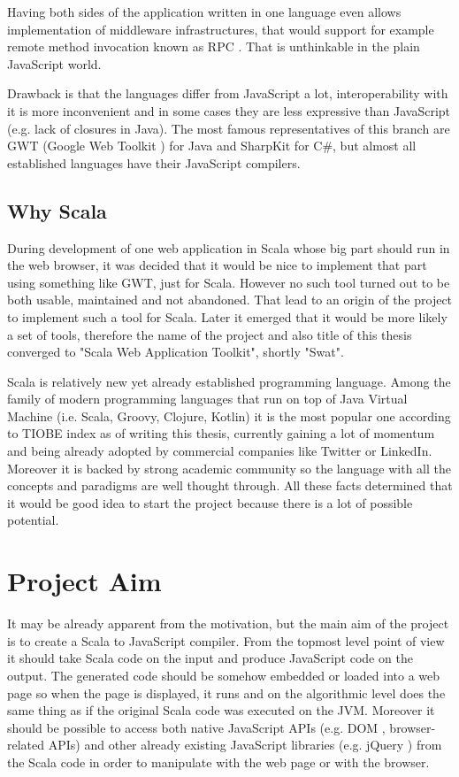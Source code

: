 \documentclass[12pt,a4paper]{report}
\begin{document}
Having both sides of the application written in one language even allows implementation of middleware infrastructures, that would support for example remote method invocation known as RPC \cite{Rpc}. That is unthinkable in the plain JavaScript world.

Drawback is that the languages differ from JavaScript a lot, interoperability with it is more inconvenient and in some cases they are less expressive than JavaScript (e.g. lack of closures in Java). The most famous representatives of this branch are GWT (Google Web Toolkit \cite{Gwt}) for Java and SharpKit \cite{SharpKit} for C\#, but almost all established languages have their JavaScript compilers.

\subsection{Why Scala}

During development of one web application in Scala whose big part should run in the web browser, it was decided that it would be nice to implement that part using something like GWT, just for Scala. However no such tool turned out to be both usable, maintained and not abandoned. That lead to an origin of the project to implement such a tool for Scala. Later it emerged that it would be more likely a set of tools, therefore the name of the project and also title of this thesis converged to "Scala Web Application Toolkit", shortly "Swat".

Scala is relatively new yet already established programming language. Among the family of modern programming languages that run on top of Java Virtual Machine (i.e. Scala, Groovy, Clojure, Kotlin) it is the most popular one according to TIOBE index \cite{Tiobe} as of writing this thesis, currently gaining a lot of momentum and being already adopted by commercial companies like Twitter or LinkedIn. Moreover it is backed by strong academic community so the language with all the concepts and paradigms are well thought through. All these facts determined that it would be good idea to start the project because there is a lot of possible potential.

\section{Project Aim}

It may be already apparent from the motivation, but the main aim of the project is to create a Scala to JavaScript compiler. From the topmost level point of view it should take Scala code on the input and produce JavaScript code on the output. The generated code should be somehow embedded or loaded into a web page so when the page is displayed, it runs and on the algorithmic level does the same thing as if the original Scala code was executed on the JVM. Moreover it should be possible to access both native JavaScript APIs (e.g. DOM \cite{Dom}, browser-related APIs) and other already existing JavaScript libraries (e.g. jQuery \cite{Jquery}) from the Scala code in order to manipulate with the web page or with the browser.
\end{document}
